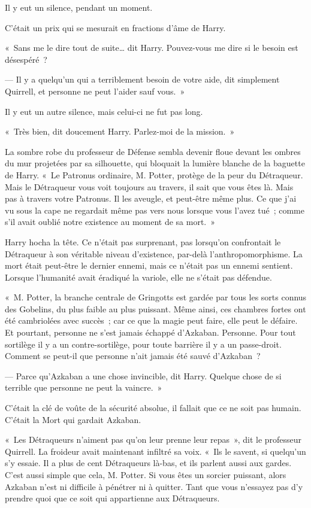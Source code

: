 Il y eut un silence, pendant un moment.

C'était un prix qui se mesurait en fractions d'âme de Harry.

«~Sans me le dire tout de suite… dit Harry.
Pouvez-vous me dire si le besoin est désespéré~?

--- Il y a quelqu'un qui a terriblement besoin de votre aide, dit simplement Quirrell, et personne ne peut l'aider sauf vous.~»

Il y eut un autre silence, mais celui-ci ne fut pas long.

«~Très bien, dit doucement Harry.
Parlez-moi de la mission.~»

La sombre robe du professeur de Défense sembla devenir floue devant les ombres du mur projetées par sa silhouette, qui bloquait la lumière blanche de la baguette de Harry.
«~Le Patronus ordinaire, M. Potter, protège de la peur du Détraqueur.
Mais le Détraqueur vous voit toujours au travers, il sait que vous êtes là.
Mais pas à travers votre Patronus.
Il les aveugle, et peut-être même plus.
Ce que j'ai vu sous la cape ne regardait même pas vers nous lorsque vous l'avez tué~; comme s'il avait oublié notre existence au moment de sa mort.~»

Harry hocha la tête.
Ce n'était pas surprenant, pas lorsqu'on confrontait le Détraqueur à son véritable niveau d'existence, par-delà l'anthropomorphisme.
La mort était peut-être le dernier ennemi, mais ce n'était pas un ennemi sentient.
Lorsque l'humanité avait éradiqué la variole, elle ne s'était pas défendue.

«~M. Potter, la branche centrale de Gringotts est gardée par tous les sorts connus des Gobelins, du plus faible au plus puissant.
Même ainsi, ces chambres fortes ont été cambriolées avec succès~; car ce que la magie peut faire, elle peut le défaire.
Et pourtant, personne ne s'est jamais échappé d'Azkaban.
Personne.
Pour tout sortilège il y a un contre-sortilège, pour toute barrière il y a un passe-droit.
Comment se peut-il que personne n'ait jamais été sauvé d'Azkaban~?

--- Parce qu'Azkaban a une chose invincible, dit Harry.
Quelque chose de si terrible que personne ne peut la vaincre.~»

C'était la clé de voûte de la sécurité absolue, il fallait que ce ne soit pas humain.
C'était la Mort qui gardait Azkaban.

«~Les Détraqueurs n'aiment pas qu'on leur prenne leur repas~», dit le professeur Quirrell.
La froideur avait maintenant infiltré sa voix.
«~Ils le savent, si quelqu'un s'y essaie.
Il a plus de cent Détraqueurs là-bas, et ils parlent aussi aux gardes.
C'est aussi simple que cela, M. Potter.
Si vous êtes un sorcier puissant, alors Azkaban n'est ni difficile à pénétrer ni à quitter.
Tant que vous n'essayez pas d'y prendre quoi que ce soit qui appartienne aux Détraqueurs.

